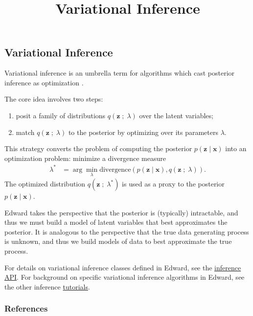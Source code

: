\title{Variational Inference}

\subsection{Variational Inference}

Variational inference is an umbrella term for algorithms which cast
posterior inference as optimization
\citep{hinton1993keeping,waterhouse1996bayesian,jordan1999introduction}.

The core idea involves two steps:
\begin{enumerate}
   \item posit a family of distributions $q(\mathbf{z}\;;\;\lambda)$
   over the latent variables;
   \item match $q(\mathbf{z}\;;\;\lambda)$ to the posterior by
   optimizing over its parameters $\lambda$.
 \end{enumerate}
This strategy converts the problem of computing the posterior
$p(\mathbf{z} \mid \mathbf{x})$ into an optimization problem:
minimize a divergence measure
\begin{align*}
  \lambda^*
  &=
  \arg\min_\lambda \text{divergence}(
  p(\mathbf{z} \mid \mathbf{x})
  ,
  q(\mathbf{z}\;;\;\lambda)
  ).
\end{align*}
The optimized distribution $q(\mathbf{z}\;;\;\lambda^*)$ is used as
a proxy to the posterior $p(\mathbf{z}\mid \mathbf{x})$.

Edward takes the perspective that the posterior is (typically)
intractable, and thus we must build a model of latent variables that
best approximates the posterior.
It is analogous to the perspective
that the true data generating process is unknown, and thus we build
models of data to best approximate the true process.

For details on variational inference classes defined in Edward,
see the \href{/api/ed/inferences}{inference API}.
For background on specific variational inference algorithms in
Edward, see the other inference \href{/tutorials/}{tutorials}.

\subsubsection{References}\label{references}

